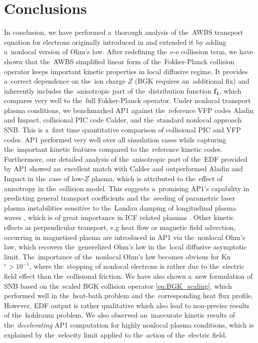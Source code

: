\documentclass[
 aps,
 jmp,
 amsmath,amssymb,
 twocolumn,
]{revtex4-1}
\newcommand{\vect}[1]{\boldsymbol{#1}}
\newcommand{\Zbar}{Z}
\newcommand{\fone}{{\vect{f_1}}}
\begin{document}
\section{Conclusions}
\label{sec:Conclusions}
In conclusion, we have performed a~thorough analysis of the~AWBS transport 
equation for electrons originally introduced in \cite{Sorbo_2015} and extended
it by adding a~nonlocal version of Ohm's law.
After redefining the~e-e collission term, we have shown that the~AWBS
simplified linear form of the~Fokker-Planck collision operator keeps
important kinetic properties in local diffusive regime. 
It provides a~correct dependence 
on the~ion charge $\Zbar$ (BGK requires an~additional fix) 
and inherently includes
the~anisotropic part of the~distribution function $\fone$, which compares
very well to the~full Fokker-Planck operator.
Under nonlocal transport plasma conditions, we benchmarked AP1 against 
the~reference VFP codes Aladin and Impact, collisional PIC code Calder, 
and the~standard nonlocal approach SNB. This is a~first time quantitative
comparison of collisional PIC and VFP codes. 
AP1 performed very well over all simulation cases while capturing 
the~important kinetic features compared to the~reference kinetic codes. 
Furthermore, our detailed analysis of the~anisotropic part of the~EDF 
provided by AP1 showed an~excellent match with Calder and outperformed
Aladin and Impact in the~case of low-$\Zbar$ plasma, which is attributed
to the~effect of anisotropy in the~collision model. 
This suggests 
a~promising AP1's capability in predicting general transport coefficients and 
the~seeding of parametric laser plasma instabilities sensitive 
to the~Landau damping of longitudinal plasma waves 
\cite{goldston1995introduction, Sorbo_2015},
which is of great importance in ICF related plasmas 
\cite{Kirkwood_NIFLPI_PPCF2013}.
Other kinetic effects as perpendicular transport, e.g heat flow
or magnetic field advection, occurring in magnetised plasma  
\cite{Walsh_Nernst_PRL2017} are introduced in
AP1 via the~nonlocal Ohm's law, which recovers 
the~generelized Ohm's law in the~local diffusive asymptotic limit.
The~importance of the~nonlocal Ohm's law becomes obvious for Kn$^e > 10^{-1}$,
where the~stopping of nonlocal electrons is rather due to the~electric field 
effect than the~collisional friction.
We have also shown a~new formulation of SNB based on
the~scaled BGK collision operator \eqref{eq:BGK_scaling}, which performed
well in the~heat-bath problem and the~corresponding heat flux profile. 
However, EDF output is rather qualitative which also lead to 
non-precise results of the~hohlraum problem.
We also observed an~inaccurate kinetic results of 
the~\textit{decelerating} AP1 computation for highly nonlocal plasma 
conditions, which is explained by the~velocity limit applied to the~action
of the~electric field.
\end{document}
